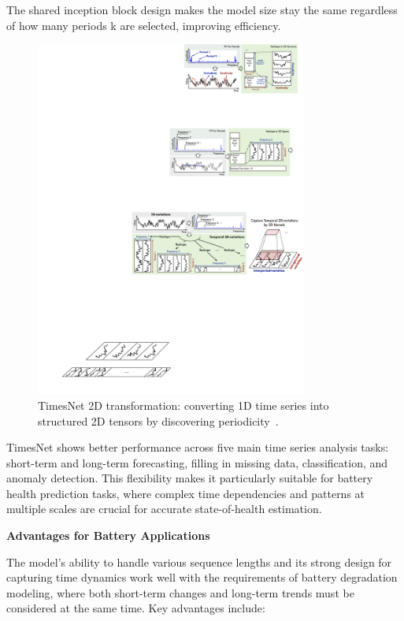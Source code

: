 The shared inception block design makes the model size stay the same regardless of how many periods k are selected, improving efficiency.

\begin{figure}[htbp]
    \centering
    \includegraphics[width=0.8\textwidth]{imgs/timesnet_2d_structure.pdf}
    \caption{TimesNet 2D transformation: converting 1D time series into structured 2D tensors by discovering periodicity~\cite{wu_timesnet_2023}.}
    \label{fig:timesnet_2d_transformation}
\end{figure}

TimesNet shows better performance across five main time series analysis tasks: short-term and long-term forecasting, filling in missing data, classification, and anomaly detection. This flexibility makes it particularly suitable for battery health prediction tasks, where complex time dependencies and patterns at multiple scales are crucial for accurate state-of-health estimation. 

\textbf{Advantages for Battery Applications}

The model's ability to handle various sequence lengths and its strong design for capturing time dynamics work well with the requirements of battery degradation modeling, where both short-term changes and long-term trends must be considered at the same time. Key advantages include:

